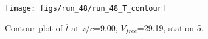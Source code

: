 \begin{figure}[H]
\centering
\texttt{[image: figs/run\_48/run\_48\_T\_contour]}
\caption{Contour plot of $\overline{t}$ at $z/c$=9.00, $V_{free}$=29.19, station 5.}
\label{fig:run_48_T_contour}
\end{figure}


